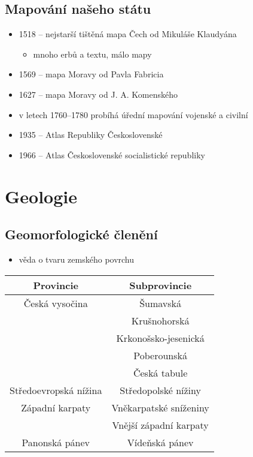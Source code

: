 \subsection{Mapování našeho státu}
\begin{itemize}
\item 1518 -- nejstarší tištěná mapa Čech od Mikuláše Klaudyána
	\begin{itemize}
	\item mnoho erbů a textu, málo mapy
	\end{itemize}
\item 1569 -- mapa Moravy od Pavla Fabricia
\item 1627 -- mapa Moravy od J. A. Komenského
\item v letech 1760--1780 probíhá úřední mapování vojenské a civilní
\item 1935 -- Atlas Republiky Československé
\item 1966 -- Atlas Československé socialistické republiky
\end{itemize}


\section{Geologie}
\subsection{Geomorfologické členění}
\begin{itemize}
\item věda o tvaru zemského povrchu
\end{itemize}

\begin{tabular}{|c|c|}
	\hline
	\textbf{Provincie} & \textbf{Subprovincie}\\
	\hline
	Česká vysočina & Šumavská\\
	& Krušnohorská\\
	& Krkonošsko-jesenická\\
	& Poberounská\\
	& Česká tabule\\
	\hline
	Středoevropská nížina & Středopolské nížiny\\
	\hline
	Západní karpaty & Vněkarpatské sníženiny \\
	& Vnější západní karpaty\\
	\hline
	Panonská pánev & Vídeňská pánev\\
	\hline

\end{tabular}


